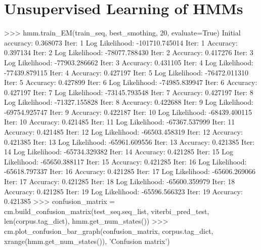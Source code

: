 \section{Unsupervised Learning of HMMs}


\begin{python}
>>> hmm.train_EM(train_seq, best_smothing, 20, evaluate=True)
Initial accuracy: 0.368073
Iter: 1 Log Likelihood: -101710.745014
Iter: 1 Accuracy: 0.397134
Iter: 2 Log Likelihood: -78077.788430
Iter: 2 Accuracy: 0.417276
Iter: 3 Log Likelihood: -77903.286662
Iter: 3 Accuracy: 0.431105
Iter: 4 Log Likelihood: -77439.879115
Iter: 4 Accuracy: 0.427197
Iter: 5 Log Likelihood: -76472.011310
Iter: 5 Accuracy: 0.427899
Iter: 6 Log Likelihood: -74985.839947
Iter: 6 Accuracy: 0.427197
Iter: 7 Log Likelihood: -73145.793548
Iter: 7 Accuracy: 0.427197
Iter: 8 Log Likelihood: -71327.155828
Iter: 8 Accuracy: 0.422688
Iter: 9 Log Likelihood: -69754.925747
Iter: 9 Accuracy: 0.422187
Iter: 10 Log Likelihood: -68439.400115
Iter: 10 Accuracy: 0.421485
Iter: 11 Log Likelihood: -67367.537999
Iter: 11 Accuracy: 0.421485
Iter: 12 Log Likelihood: -66503.458319
Iter: 12 Accuracy: 0.421385
Iter: 13 Log Likelihood: -65961.609556
Iter: 13 Accuracy: 0.421385
Iter: 14 Log Likelihood: -65734.329382
Iter: 14 Accuracy: 0.421285
Iter: 15 Log Likelihood: -65650.388117
Iter: 15 Accuracy: 0.421285
Iter: 16 Log Likelihood: -65618.797337
Iter: 16 Accuracy: 0.421285
Iter: 17 Log Likelihood: -65606.269066
Iter: 17 Accuracy: 0.421285
Iter: 18 Log Likelihood: -65600.359979
Iter: 18 Accuracy: 0.421285
Iter: 19 Log Likelihood: -65596.566323
Iter: 19 Accuracy: 0.421385
>>> confusion_matrix = cm.build_confusion_matrix(test_seq.seq_list, viterbi_pred_test, len(corpus.tag_dict), hmm.get_num_states())
>>> cm.plot_confusion_bar_graph(confusion_matrix, corpus.tag_dict, xrange(hmm.get_num_states()), 'Confusion matrix')
\end{python}